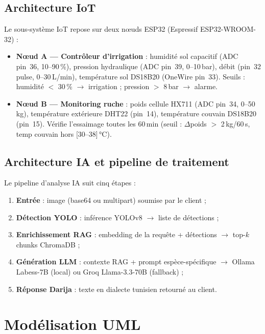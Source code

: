 \subsection{Architecture IoT}

Le sous-système IoT repose sur deux nœuds ESP32 (Espressif ESP32-WROOM-32) :
\begin{itemize}
  \item \textbf{Nœud A — Contrôleur d'irrigation} :
        humidité sol capacitif (ADC pin~36, 10--90\,\%), pression hydraulique
        (ADC pin~39, 0--10\,bar), débit (pin~32 pulse, 0--30\,L/min),
        température sol DS18B20 (OneWire pin~33).
        Seuils : humidité $<$ 30\,\% $\rightarrow$ irrigation ; pression $>$ 8\,bar $\rightarrow$ alarme.
  \item \textbf{Nœud B — Monitoring ruche} :
        poids cellule HX711 (ADC pin~34, 0--50\,kg),
        température extérieure DHT22 (pin~14),
        température couvain DS18B20 (pin~15).
        Vérifie l'essaimage toutes les 60\,min
        (seuil : $\Delta$poids $>$ 2\,kg/60\,s, temp couvain hors [30--38]\,°C).
\end{itemize}

\subsection{Architecture IA et pipeline de traitement}

Le pipeline d'analyse IA suit cinq étapes :
\begin{enumerate}
  \item \textbf{Entrée} : image (base64 ou multipart) soumise par le client ;
  \item \textbf{Détection YOLO} : inférence YOLOv8 $\rightarrow$ liste de détections ;
  \item \textbf{Enrichissement RAG} : embedding de la requête + détections $\rightarrow$ top-$k$ chunks ChromaDB ;
  \item \textbf{Génération LLM} : contexte RAG + prompt espèce-spécifique $\rightarrow$ Ollama Labess-7B (local) ou Groq Llama-3.3-70B (fallback) ;
  \item \textbf{Réponse Darija} : texte en dialecte tunisien retourné au client.
\end{enumerate}

\section{Modélisation UML}

